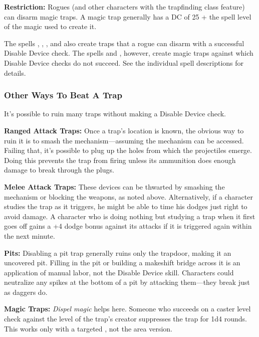 \textbf{Restriction:} Rogues (and other characters with the trapfinding class feature) can disarm magic traps. A magic trap generally has a DC of 25 + the spell level of the magic used to create it.

The spells , , , and  also create traps that a rogue can disarm with a successful Disable Device check. The spells  and , however, create magic traps against which Disable Device checks do not succeed. See the individual spell descriptions for details.

\subsubsection{Other Ways To Beat A Trap}
It's possible to ruin many traps without making a Disable Device check.

\textbf{Ranged Attack Traps:} Once a trap's location is known, the obvious way to ruin it is to smash the mechanism---assuming the mechanism can be accessed. Failing that, it's possible to plug up the holes from which the projectiles emerge. Doing this prevents the trap from firing unless its ammunition does enough damage to break through the plugs.

\textbf{Melee Attack Traps:} These devices can be thwarted by smashing the mechanism or blocking the weapons, as noted above. Alternatively, if a character studies the trap as it triggers, he might be able to time his dodges just right to avoid damage. A character who is doing nothing but studying a trap when it first goes off gains a +4 dodge bonus against its attacks if it is triggered again within the next minute.

\textbf{Pits:} Disabling a pit trap generally ruins only the trapdoor, making it an uncovered pit. Filling in the pit or building a makeshift bridge across it is an application of manual labor, not the Disable Device skill. Characters could neutralize any spikes at the bottom of a pit by attacking them---they break just as daggers do.

\textbf{Magic Traps:} \emph{Dispel magic} helps here. Someone who succeeds on a caster level check against the level of the trap's creator suppresses the trap for 1d4 rounds. This works only with a targeted , not the area version.